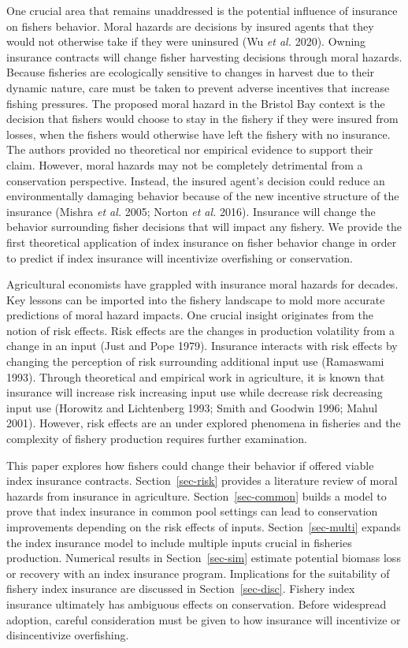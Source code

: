 \documentclass[
  letterpaper,
  DIV=11,
  numbers=noendperiod]{scrartcl}
\theoremstyle{plain}
\theoremstyle{plain}
\theoremstyle{remark}
\begin{document}
One crucial area that remains unaddressed is the potential influence of
insurance on fishers behavior. Moral hazards are decisions by insured
agents that they would not otherwise take if they were uninsured (Wu
\emph{et al.} 2020). Owning insurance contracts will change fisher
harvesting decisions through moral hazards. Because fisheries are
ecologically sensitive to changes in harvest due to their dynamic
nature, care must be taken to prevent adverse incentives that increase
fishing pressures. The proposed moral hazard in the Bristol Bay context
is the decision that fishers would choose to stay in the fishery if they
were insured from losses, when the fishers would otherwise have left the
fishery with no insurance. The authors provided no theoretical nor
empirical evidence to support their claim. However, moral hazards may
not be completely detrimental from a conservation perspective. Instead,
the insured agent's decision could reduce an environmentally damaging
behavior because of the new incentive structure of the insurance (Mishra
\emph{et al.} 2005; Norton \emph{et al.} 2016). Insurance will change
the behavior surrounding fisher decisions that will impact any fishery.
We provide the first theoretical application of index insurance on
fisher behavior change in order to predict if index insurance will
incentivize overfishing or conservation.

Agricultural economists have grappled with insurance moral hazards for
decades. Key lessons can be imported into the fishery landscape to mold
more accurate predictions of moral hazard impacts. One crucial insight
originates from the notion of risk effects. Risk effects are the changes
in production volatility from a change in an input (Just and Pope 1979).
Insurance interacts with risk effects by changing the perception of risk
surrounding additional input use (Ramaswami 1993). Through theoretical
and empirical work in agriculture, it is known that insurance will
increase risk increasing input use while decrease risk decreasing input
use (Horowitz and Lichtenberg 1993; Smith and Goodwin 1996; Mahul 2001).
However, risk effects are an under explored phenomena in fisheries and
the complexity of fishery production requires further examination.

This paper explores how fishers could change their behavior if offered
viable index insurance contracts. Section~\ref{sec-risk} provides a
literature review of moral hazards from insurance in agriculture.
Section~\ref{sec-common} builds a model to prove that index insurance in
common pool settings can lead to conservation improvements depending on
the risk effects of inputs. Section~\ref{sec-multi} expands the index
insurance model to include multiple inputs crucial in fisheries
production. Numerical results in Section~\ref{sec-sim} estimate
potential biomass loss or recovery with an index insurance program.
Implications for the suitability of fishery index insurance are
discussed in Section~\ref{sec-disc}. Fishery index insurance ultimately
has ambiguous effects on conservation. Before widespread adoption,
careful consideration must be given to how insurance will incentivize or
disincentivize overfishing.
\end{document}
